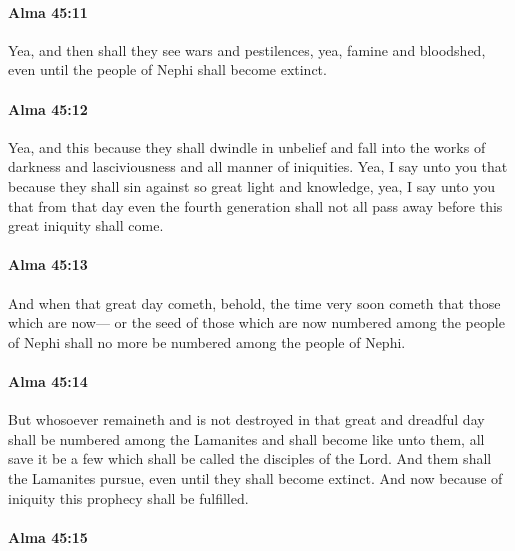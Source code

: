 		\paragraph{Alma 45:11} %
			\label{ALMA-45-11}

			Yea, and then shall they see wars and pestilences,
			yea, famine and bloodshed,
			even until the people of Nephi shall become extinct.

		\paragraph{Alma 45:12} %
			\label{ALMA-45-12}

			Yea, and this because they shall dwindle in unbelief
			and fall into the works of darkness and lasciviousness and all manner of iniquities.
			Yea, I say unto you that
			because they shall sin against so great light and knowledge,
			yea, I say unto you that from that day
			even the fourth generation shall not all pass away
			before this great iniquity shall come.

		\paragraph{Alma 45:13} %
			\label{ALMA-45-13}

			And when that great day cometh,
			behold, the time very soon cometh
			that those which are now---
			or the seed of those which are now numbered among the people of Nephi
			shall no more be numbered among the people of Nephi.

		\paragraph{Alma 45:14} %
			\label{ALMA-45-14}

			But whosoever remaineth and is not destroyed in that great and dreadful day
			shall be numbered among the Lamanites
			and shall become like unto them,
			all save it be a few which shall be called the disciples of the Lord.
			And them shall the Lamanites pursue,
			even until they shall become extinct.
			And now because of iniquity this prophecy shall be fulfilled.

		\paragraph{Alma 45:15} %
			\label{ALMA-45-15}

